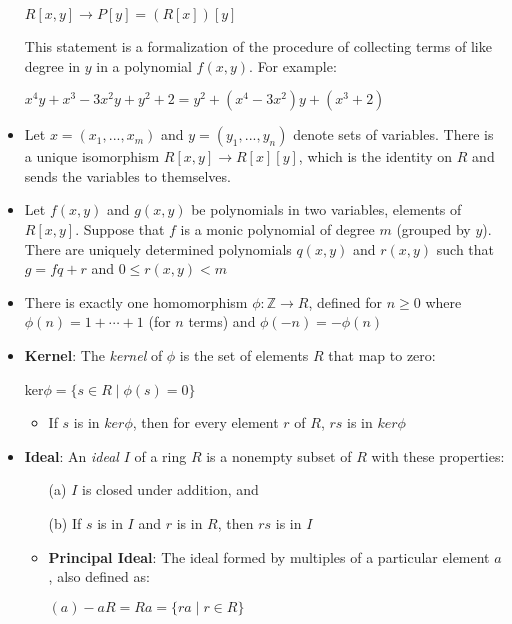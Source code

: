\documentclass[12pt]{article}
\begin{document}
\begin{itemize}
  \begin{center}
    $R[x,y] \to P[y] = (R[x])[y]$
  \end{center}
  This statement is a formalization of the procedure of collecting terms of like degree in $y$ in a polynomial $f(x,y)$. For example:
  \begin{center}
    $x^4y + x^3 - 3x^2y + y^2 + 2 = y^2 + (x^4 - 3x^2)y + (x^3 + 2)$
  \end{center}
  \item Let $x = (x_1, ..., x_m)$ and $y = (y_1, ..., y_n)$ denote sets of variables. There is a unique isomorphism $R[x,y] \to R[x][y]$, which is the identity on $R$ and sends the variables to themselves.
  \item Let $f(x,y)$ and $g(x,y)$ be polynomials in two variables, elements of $R[x,y]$. Suppose that $f$ is a monic polynomial of degree $m$ (grouped by $y$). There are uniquely determined polynomials $q(x,y)$ and $r(x,y)$ such that $g = fq + r$ and $0 \leqslant r(x,y) < m$
  \item There is exactly one homomorphism $\phi: \mathbb{Z} \to R$, defined for $n \geqslant 0$ where $\phi(n) = 1 + \cdots + 1$ (for $n$ terms) and $\phi(-n) = -\phi(n)$
  \item \textbf{Kernel}: The \textit{kernel} of $\phi$ is the set of elements $R$ that map to zero:
  \begin{center}
    ker$\phi = \{s \in R \mid \phi(s) = 0\}$
  \end{center}
  \begin{itemize}
    \item If $s$ is in $ker\phi$, then for every element $r$ of $R$, $rs$ is in $ker\phi$
  \end{itemize}
  \item \textbf{Ideal}: An \textit{ideal} $I$ of a ring $R$ is a nonempty subset of $R$ with these properties:
  \begin{enumerate}
    \item[(a)] $I$ is closed under addition, and
    \item[(b)] If $s$ is in $I$ and $r$ is in $R$, then $rs$ is in $I$
  \end{enumerate}
  \begin{itemize}
    \item \textbf{Principal Ideal}: The ideal formed by multiples of a particular element $a$, also defined as:
    \begin{center}
      $(a) - aR = Ra = \{ra \mid r \in R\}$
    \end{center}

\end{itemize}
\end{itemize}
\end{document}
